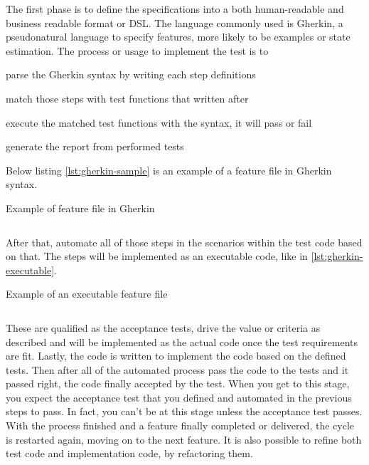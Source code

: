 The first phase is to define the specifications into a both human-readable and business readable format or \ac{DSL}.
The language commonly used is Gherkin, a pseudonatural language to specify features, more likely to be examples or state estimation.
The process or usage to implement the test is to
\begin{inparaenum}[\itshape 1\upshape)]
\item parse the Gherkin syntax by writing each step definitions
\item match those steps with test functions that written after
\item execute the matched test functions with the syntax, it will pass or fail
\item generate the report from performed tests
\end{inparaenum}

Below listing \autoref{lst:gherkin-sample} is an example of a feature file in Gherkin syntax.

\begin{listing}[htb]
\caption{Example of feature file in Gherkin}
\inputminted{ruby}{\dir/include/gherkin-sample.txt}
\label{lst:gherkin-sample}
\end{listing}

After that, automate all of those steps in the scenarios within the test code based on that.
The steps will be implemented as an executable code, like in \autoref{lst:gherkin-executable}.

\begin{listing}[!htb]
\caption{Example of an executable feature file}
\inputminted{javascript}{\dir/include/gherkin-executable.js}
\label{lst:gherkin-executable}
\end{listing}

These are qualified as the acceptance tests, drive the value or criteria as described and will be implemented as the actual code once the test requirements are fit.
Lastly, the code is written to implement the code based on the defined tests.
Then after all of the automated process pass the code to the tests and it passed right, the code finally accepted by the test.
When you get to this stage, you expect the acceptance test that you defined and automated in the previous steps to pass. In fact, you can't be at this stage unless the acceptance test passes.
With the process finished and a feature finally completed or delivered, the cycle is restarted again, moving on to the next feature.
It is also possible to refine both test code and implementation code, by refactoring them.
